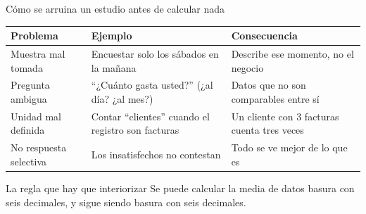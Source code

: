 \documentclass[aspectratio=169,10pt]{beamer}
\begin{document}
\begin{frame}{Cómo se arruina un estudio antes de calcular nada}
  \scriptsize
  \begin{center}
  \begin{tabular}{@{}p{3.2cm}p{4.2cm}p{4.6cm}@{}}
    \toprule
    \textbf{Problema} & \textbf{Ejemplo} & \textbf{Consecuencia} \\
    \midrule
    Muestra mal tomada &
      Encuestar solo los sábados en la mañana &
      Describe ese momento, no el negocio \\
    \addlinespace
    Pregunta ambigua &
      ``¿Cuánto gasta usted?'' (¿al día? ¿al mes?) &
      Datos que no son comparables entre sí \\
    \addlinespace
    Unidad mal definida &
      Contar ``clientes'' cuando el registro son facturas &
      Un cliente con 3 facturas cuenta tres veces \\
    \addlinespace
    No respuesta selectiva &
      Los insatisfechos no contestan &
      Todo se ve mejor de lo que es \\
    \bottomrule
  \end{tabular}
  \end{center}

  \vspace{0.1cm}
  \begin{alertblock}{La regla que hay que interiorizar}
    \scriptsize
     Se puede calcular
    la media de datos basura con seis decimales, y sigue siendo basura con seis
    decimales.
  \end{alertblock}
\end{frame}
\end{document}
